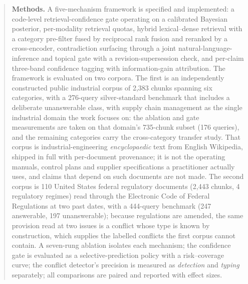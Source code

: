 \documentclass[preprint,3p,times]{elsarticle}
\begin{document}
\begin{abstract}
\textbf{Methods.} A five-mechanism framework is specified and implemented:
a code-level retrieval-confidence gate operating on a calibrated Bayesian
posterior, per-modality retrieval quotas, hybrid lexical--dense retrieval with
a category pre-filter fused by reciprocal rank fusion and reranked by a
cross-encoder, contradiction surfacing through a joint natural-language-
inference and topical gate with a revision-supersession check, and per-claim
three-band confidence tagging with information-gain attribution. The framework
is evaluated on two corpora. The first is an independently constructed public
industrial corpus of 2{,}383
chunks spanning six categories, with a 276-query silver-standard benchmark
that includes a deliberate unanswerable class, with supply chain management as the
single industrial domain the work focuses on: the ablation and gate measurements
are taken on that domain's 735-chunk subset (176
queries), and the remaining categories carry the cross-category transfer study.
That corpus is industrial-engineering
\emph{encyclopaedic} text from English Wikipedia, shipped in full with per-document
provenance; it is not the operating manuals, control plans and supplier
specifications a practitioner actually uses, and claims that depend on such
documents are not made. The second corpus is 110 United States
federal regulatory documents (2,443 chunks, 4 regulatory
regimes) read through the Electronic Code of Federal Regulations at two past
dates, with a 444-query benchmark (247 answerable,
197 unanswerable); because regulations are amended, the same
provision read at two issues is a conflict whose type is known by construction,
which supplies the labelled conflicts the first corpus cannot contain. A
seven-rung ablation isolates
each mechanism; the confidence gate is evaluated as a selective-prediction
policy with a risk--coverage curve; the conflict detector's precision is
measured as \emph{detection} and \emph{typing} separately; all comparisons are
paired and reported with effect sizes.


\end{abstract}
\end{document}
